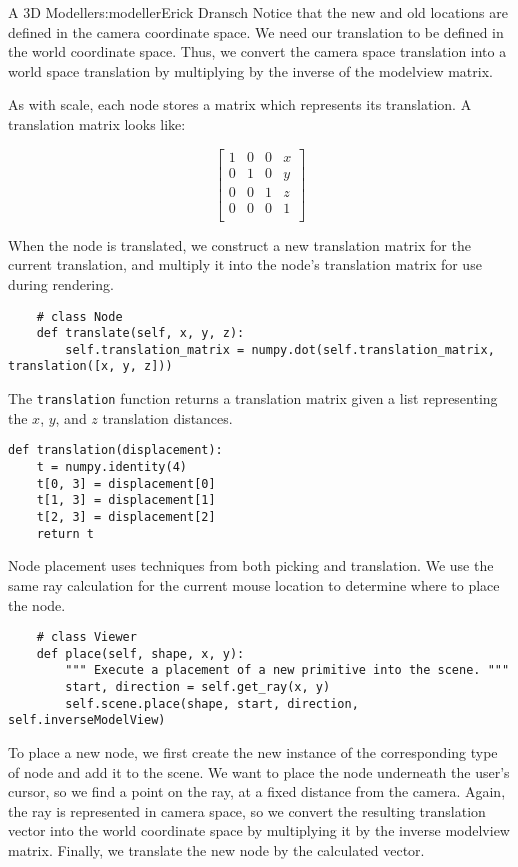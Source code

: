 \begin{aosachapter}{A 3D Modeller}{s:modeller}{Erick Dransch}
Notice that the new and old locations are defined in the camera
coordinate space. We need our translation to be defined in the world
coordinate space. Thus, we convert the camera space translation into a
world space translation by multiplying by the inverse of the modelview
matrix.

As with scale, each node stores a matrix which represents its
translation. A translation matrix looks like:

\[
   \begin{bmatrix}
   1 & 0 & 0 & x \\
   0 & 1 & 0 & y \\
   0 & 0 & 1 & z \\
   0 & 0 & 0 & 1 \\
   \end{bmatrix}
\]

When the node is translated, we construct a new translation matrix for
the current translation, and multiply it into the node's translation
matrix for use during rendering.

\begin{verbatim}
    # class Node
    def translate(self, x, y, z):
        self.translation_matrix = numpy.dot(self.translation_matrix, translation([x, y, z]))
\end{verbatim}

The \texttt{translation} function returns a translation matrix given a
list representing the $x$, $y$, and $z$ translation distances.

\begin{verbatim}
def translation(displacement):
    t = numpy.identity(4)
    t[0, 3] = displacement[0]
    t[1, 3] = displacement[1]
    t[2, 3] = displacement[2]
    return t
\end{verbatim}

\label{placing-nodes}

Node placement uses techniques from both picking and translation. We use
the same ray calculation for the current mouse location to determine
where to place the node.

\begin{verbatim}
    # class Viewer
    def place(self, shape, x, y):
        """ Execute a placement of a new primitive into the scene. """
        start, direction = self.get_ray(x, y)
        self.scene.place(shape, start, direction, self.inverseModelView)
\end{verbatim}

To place a new node, we first create the new instance of the
corresponding type of node and add it to the scene. We want to place the
node underneath the user's cursor, so we find a point on the ray, at a
fixed distance from the camera. Again, the ray is represented in camera
space, so we convert the resulting translation vector into the world
coordinate space by multiplying it by the inverse modelview matrix.
Finally, we translate the new node by the calculated vector.


\end{aosachapter}
